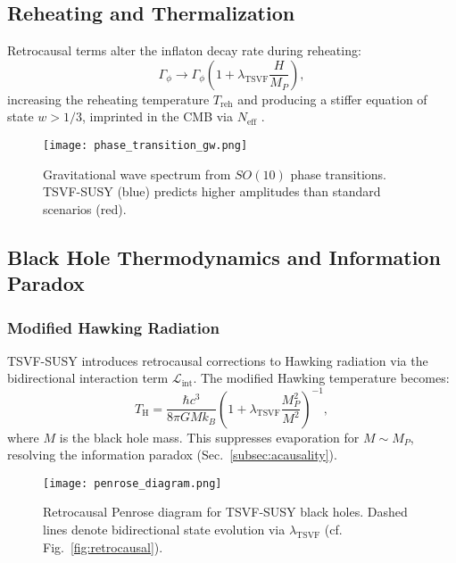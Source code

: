 \documentclass[twocolumn,superscriptaddress,floatfix]{revtex4-2}
\newcommand{\Lint}{\mathcal{L}_{\text{int}}}
\newcommand{\tsvf}{\lambda_{\text{TSVF}}}
\begin{document}
\subsection{Reheating and Thermalization}  
\label{subsec:reheating}  

Retrocausal terms alter the inflaton decay rate during reheating:  
\begin{equation}  
\Gamma_\phi \to \Gamma_\phi \left(1 + \lambda_{\text{TSVF}} \frac{H}{M_P}\right),  
\label{eq:reheating}  
\end{equation}  
increasing the reheating temperature \(T_{\text{reh}}\) and producing a stiffer equation of state \(w > 1/3\), imprinted in the CMB via \(N_{\text{eff}}\) \cite{Planck2018}.  

\begin{figure}[htbp]  
\centering  
\texttt{[image: phase\_transition\_gw.png]}  
\caption{Gravitational wave spectrum from \(SO(10)\) phase transitions. TSVF-SUSY (blue) predicts higher amplitudes than standard scenarios (red).}  
\label{fig:phase_transition_gw}  
\end{figure}  


\subsection{Black Hole Thermodynamics and Information Paradox}  
\label{subsec:bh_thermo}  

\subsubsection{Modified Hawking Radiation}  
TSVF-SUSY introduces retrocausal corrections to Hawking radiation via the bidirectional interaction term \(\Lint\). The modified Hawking temperature becomes:  
\begin{equation}  
T_{\text{H}} = \frac{\hbar c^3}{8\pi G M k_B} \left(1 + \tsvf \frac{M_P^2}{M^2}\right)^{-1},  
\label{eq:modified_hawking}  
\end{equation}  
where \(M\) is the black hole mass. This suppresses evaporation for \(M \sim M_P\), resolving the information paradox (Sec.~\ref{subsec:acausality}).  

\begin{figure}[htbp]  
\centering  
\texttt{[image: penrose\_diagram.png]}  
\caption{Retrocausal Penrose diagram for TSVF-SUSY black holes. Dashed lines denote bidirectional state evolution via \(\tsvf\) (cf. Fig.~\ref{fig:retrocausal}).}  
\label{fig:penrose}  
\end{figure}  
\end{document}

